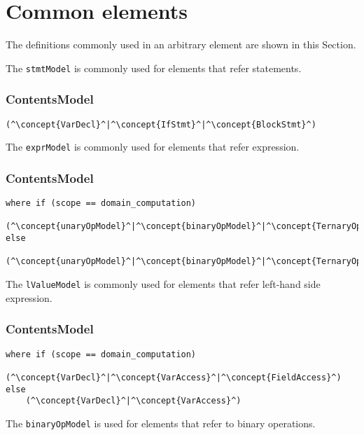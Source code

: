 \section{Common elements}
The definitions commonly used in an arbitrary element are shown in this Section.

The {\tt stmtModel} is commonly used for elements that refer statements.

\subsubsection*{ContentsModel}{}

\begin{lstlisting}[style=default,frame=none]
(^\concept{VarDecl}^|^\concept{IfStmt}^|^\concept{BlockStmt}^)
\end{lstlisting}


The {\tt exprModel} is commonly used for elements that refer expression.

\subsubsection*{ContentsModel}{}

\begin{lstlisting}[style=default,frame=none]
where if (scope == domain_computation)    
    (^\concept{unaryOpModel}^|^\concept{binaryOpModel}^|^\concept{TernaryOp}^|^\concept{Literal}^|^\concept{FieldAccess}^|^\concept{VarAccess}^|^\concept{FctCall}^)
else
    (^\concept{unaryOpModel}^|^\concept{binaryOpModel}^|^\concept{TernaryOp}^|^\concept{VarAccess}^|^\concept{Literal}^|^\concept{FctCall}^)
\end{lstlisting}


The {\tt lValueModel} is commonly used for elements that refer left-hand side
expression.

\subsubsection*{ContentsModel}{}

\begin{lstlisting}[style=default,frame=none]
where if (scope == domain_computation)    
    (^\concept{VarDecl}^|^\concept{VarAccess}^|^\concept{FieldAccess}^)
else
    (^\concept{VarDecl}^|^\concept{VarAccess}^)
\end{lstlisting}


The {\tt binaryOpModel} is used for elements that refer to binary operations.


